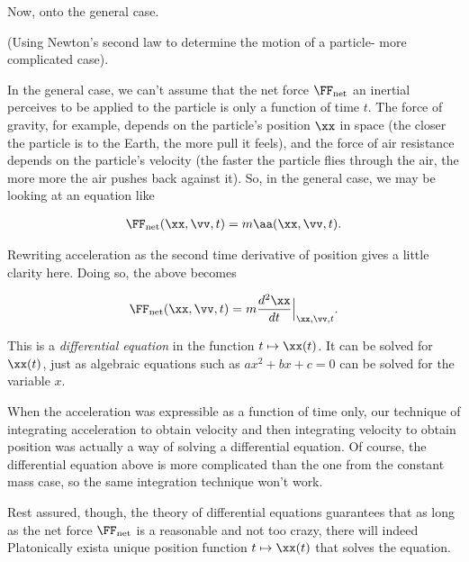 \documentclass{article}
\begin{document}
\addtocounter{footnote}{-2}

Now, onto the general case.

\begin{deriv}
    (Using Newton's second law to determine the motion of a particle- more complicated case).

    In the general case, we can't assume that the net force $\FF_{\text{net}}$ an inertial perceives to be applied to the particle is only a function of time $t$. The force of gravity, for example, depends on the particle's position $\xx$ in space (the closer the particle is to the Earth, the more pull it feels), and the force of air resistance depends on the particle's velocity (the faster the particle flies through the air, the more more the air pushes back against it). So, in the general case, we may be looking at an equation like

    \begin{align*}
        \FF_{\text{net}}(\xx, \vv, t) = m\aa(\xx, \vv, t).
    \end{align*}

    Rewriting acceleration as the second time derivative of position gives a little clarity here. Doing so, the above becomes

    \begin{align*}
        \FF_{\text{net}}(\xx, \vv, t) = m \frac{d^2 \xx}{dt}\Big|_{\xx, \vv, t}.
    \end{align*}

    This is a \textit{differential equation} in the function $t \mapsto \xx(t)$. It can be solved for $\xx(t)$, just as algebraic equations such as $ax^2 + bx + c = 0$ can be solved for the variable $x$.

    When the acceleration was expressible as a function of time only, our technique of integrating acceleration to obtain velocity and then integrating velocity to obtain position was actually a way of solving a differential equation. Of course, the differential equation above is more complicated than the one from the constant mass case, so the same integration technique won't work.
    
    Rest assured, though, the theory of differential equations guarantees that as long as the net force $\FF_{\text{net}}$ is a reasonable and not too crazy, there will indeed Platonically exist\footnotemark a unique position function $t \mapsto \xx(t)$ that solves the equation\footnotemark.
\end{deriv}
\end{document}
